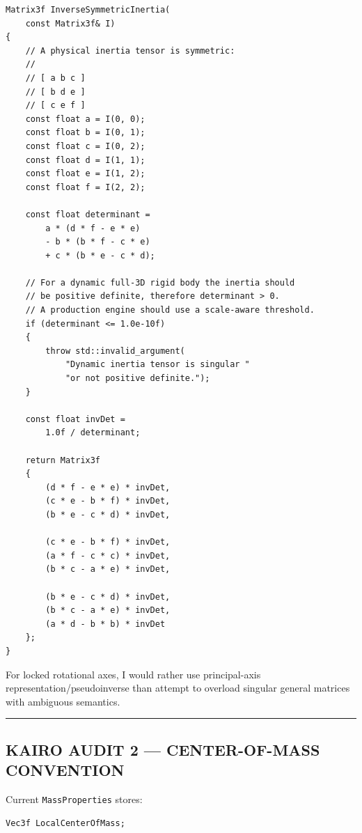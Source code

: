 \begin{verbatim}
Matrix3f InverseSymmetricInertia(
    const Matrix3f& I)
{
    // A physical inertia tensor is symmetric:
    //
    // [ a b c ]
    // [ b d e ]
    // [ c e f ]
    const float a = I(0, 0);
    const float b = I(0, 1);
    const float c = I(0, 2);
    const float d = I(1, 1);
    const float e = I(1, 2);
    const float f = I(2, 2);

    const float determinant =
        a * (d * f - e * e)
        - b * (b * f - c * e)
        + c * (b * e - c * d);

    // For a dynamic full-3D rigid body the inertia should
    // be positive definite, therefore determinant > 0.
    // A production engine should use a scale-aware threshold.
    if (determinant <= 1.0e-10f)
    {
        throw std::invalid_argument(
            "Dynamic inertia tensor is singular "
            "or not positive definite.");
    }

    const float invDet =
        1.0f / determinant;

    return Matrix3f
    {
        (d * f - e * e) * invDet,
        (c * e - b * f) * invDet,
        (b * e - c * d) * invDet,

        (c * e - b * f) * invDet,
        (a * f - c * c) * invDet,
        (b * c - a * e) * invDet,

        (b * e - c * d) * invDet,
        (b * c - a * e) * invDet,
        (a * d - b * b) * invDet
    };
}
\end{verbatim}

For locked rotational axes, I would rather use principal-axis representation/pseudoinverse than attempt to overload singular general matrices with ambiguous semantics.

\begin{center}\rule{0.5\linewidth}{0.5pt}\end{center}

\subsection{KAIRO AUDIT 2 --- CENTER-OF-MASS CONVENTION}\label{06-engine-ii-ch035-kairo-audit-2-center-of-mass-convention}

\hypertarget{06-engine-ii-ch035-kairo-audit-2-center-of-mass-convention}{}

Current \texttt{MassProperties} stores:

\begin{verbatim}
Vec3f LocalCenterOfMass;
\end{verbatim}

